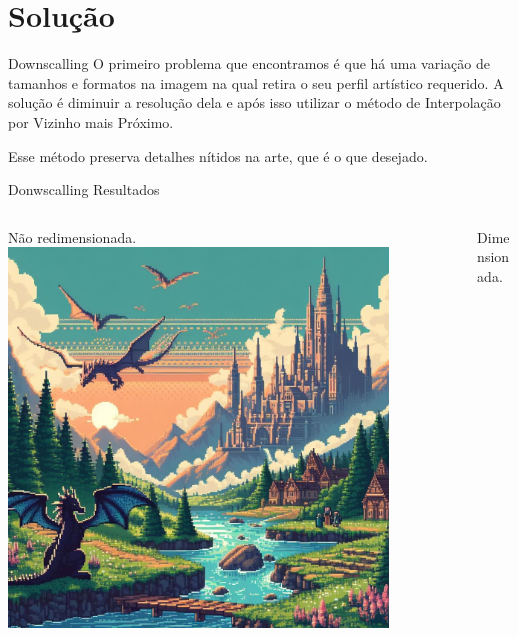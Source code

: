 \documentclass[compress,12pt]{beamer}
\begin{document}
\section{Solução}

\begin{frame}{Downscalling}
    O primeiro problema que encontramos é que há uma variação de tamanhos e formatos na imagem na qual retira o seu perfil artístico requerido. A solução é diminuir a resolução dela e após isso utilizar o método de Interpolação por Vizinho mais Próximo.
    
    Esse método preserva detalhes nítidos na arte, que é o que desejado.
\end{frame}

\begin{frame}{Donwscalling Resultados}
	\begin{columns}
		\begin{column}{0.5\textwidth}  %
			\begin{center}
                {Não redimensionada.}
				\includegraphics[width=0.85\textwidth]{Images/aiGeneratedPixelArt-2.jpg}
			\end{center}
		\end{column}
		\begin{column}{0.5\textwidth}  %
			\begin{center}
                {Dimensionada.}

\end{center}
\end{column}
\end{columns}
\end{frame}
\end{document}
